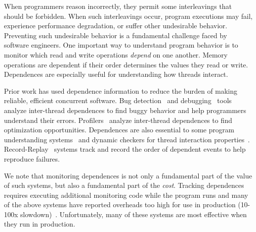\documentclass[preprint,9pt]{sigplanconf}
\begin{document}
When programmers reason incorrectly, they permit some interleavings that should
be forbidden.  When such interleavings occur, program executions may fail,
experience performance degradation, or suffer other undesirable behavior.
Preventing such undesirable behavior is a fundamental challenge faced by
software engineers.  One important way to understand program behavior is to
monitor which read and write operations {\em depend} on one another.  Memory
operations are dependent if their order determines the values they read or
write.  Dependences are especially useful for understanding how threads
interact.   



Prior work has used dependence information to reduce the burden of making
reliable, efficient concurrent software.  Bug
detection~\cite{avio,fasttrack,raceslicing,dmtracker} and
debugging~\cite{tipslicingsurvey,bugaboo,recon,cci,defuse,conseq,falcon} tools
analyze inter-thread dependences to find buggy behavior and help programmers
understand their errors.
Profilers~\cite{threadclustering,schedpredictionmodel} analyze inter-thread
dependences to find optimization opportunities.  Dependences are also essential
to some program understanding systems~\cite{oshatr} and dynamic checkers for
thread interaction properties~\cite{oshajava,velodrome}.
Record-Replay~\cite{chimera,doubleplay,fdr,rtr} systems track and record the
order of dependent events to help reproduce failures.  


We note that monitoring dependences is not only a fundamental part of the value
of such systems, but also a fundamental part of the {\em cost}.  Tracking
dependences requires executing additional monitoring code while the program
runs and many of the above systems have reported overheads too high for use in
production (10-100x
slowdown)~\cite{raceslicing,dmtracker,velodrome,recon,defuse,oshajava,chimera,coredet,stm}.
Unfortunately, many of these systems are most effective when they run in
production.
\end{document}

